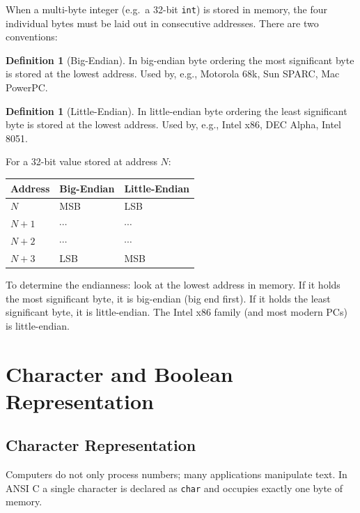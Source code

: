 \documentclass[11pt, a4paper, notitlepage]{report}
\theoremstyle{definition}
\newtheorem{definition}[theorem]{Definition}
\theoremstyle{remark}
\theoremstyle{definition}
\begin{document}
When a multi-byte integer (e.g.\ a 32-bit \texttt{int}) is stored in memory, the four individual bytes must be laid out in consecutive addresses. There are two conventions:

\begin{definition}[Big-Endian]
\label{def:big-endian}
In big-endian byte ordering the most significant byte is stored at the lowest address. Used by, e.g., Motorola 68k, Sun SPARC, Mac PowerPC\@.
\end{definition}

\begin{definition}[Little-Endian]
\label{def:little-endian}
In little-endian byte ordering the least significant byte is stored at the lowest address. Used by, e.g., Intel x86, DEC Alpha, Intel 8051.
\end{definition}

For a 32-bit value stored at address $N$:

\begin{center}
\begin{tabular}{lll}
\toprule
\textbf{Address} & \textbf{Big-Endian} & \textbf{Little-Endian} \\
\midrule
$N$ & MSB & LSB \\
$N+1$ & $\cdots$ & $\cdots$ \\
$N+2$ & $\cdots$ & $\cdots$ \\
$N+3$ & LSB & MSB \\
\bottomrule
\end{tabular}
\end{center}

\begin{examtip}[title={Endianness Quick Check}]
To determine the endianness: look at the lowest address in memory. If it holds the most significant byte, it is big-endian (big end first). If it holds the least significant byte, it is little-endian. The Intel x86 family (and most modern PCs) is little-endian.
\end{examtip}

\section{Character and Boolean Representation}

\subsection{Character Representation}

Computers do not only process numbers; many applications manipulate text. In ANSI C a single character is declared as \texttt{char} and occupies exactly one byte of memory.
\end{document}
